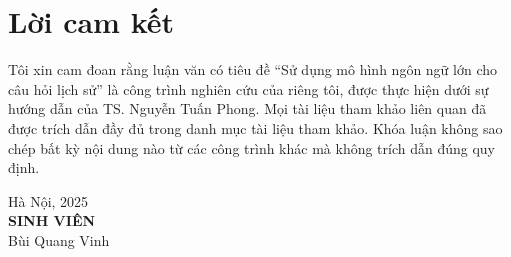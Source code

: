 \chapter*{Lời cam kết}


{\large
Tôi xin cam đoan rằng luận văn có tiêu đề “Sử dụng mô hình ngôn ngữ lớn cho câu hỏi lịch sử” là công trình nghiên cứu của riêng tôi, được thực hiện dưới sự hướng dẫn của TS. Nguyễn Tuấn Phong. Mọi tài liệu tham khảo liên quan đã được trích dẫn đầy đủ trong danh mục tài liệu tham khảo. Khóa luận không sao chép bất kỳ nội dung nào từ các công trình khác mà không trích dẫn đúng quy định.
}
\vspace{2cm}
\begin{flushleft}

\hfill
\begin{minipage}{0.45\textwidth}
\centering
Hà Nội, 2025\\[1cm]
\textbf{SINH VIÊN}\\[0.5cm]
Bùi Quang Vinh
\end{minipage}
\end{flushleft}
\newpage
